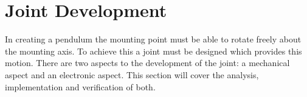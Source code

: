 \section{Joint Development}
\label{sec:joint_development}
In creating a pendulum the mounting point must be able to rotate freely about the mounting axis.
To achieve this a joint must be designed which provides this motion.
There are two aspects to the development of the joint: a mechanical aspect and an electronic aspect.
This section will cover the analysis, implementation and verification of both.







